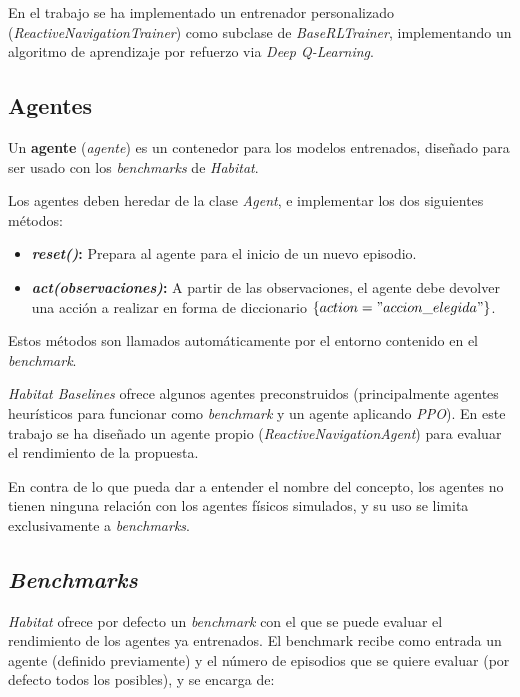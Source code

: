 En el trabajo se ha implementado un entrenador personalizado (\textit{ReactiveNavigationTrainer}) como subclase de \textit{BaseRLTrainer}, implementando un algoritmo de aprendizaje por refuerzo via \textit{Deep Q-Learning}.

\subsection{Agentes}

Un \textbf{agente} (\textit{agente}) es un contenedor para los modelos entrenados, diseñado para ser usado con los \textit{benchmarks} de \textit{Habitat}.

Los agentes deben heredar de la clase \textit{Agent}, e implementar los dos siguientes métodos:

\begin{itemize}
	\item \textbf{\textit{reset()}:} Prepara al agente para el inicio de un nuevo episodio.
	\item \textbf{\textit{act(observaciones)}:} A partir de las observaciones, el agente debe devolver una acción a realizar en forma de diccionario $\{action="accion\_elegida"\}$.
\end{itemize}

Estos métodos son llamados automáticamente por el entorno contenido en el \textit{benchmark}.

\textit{Habitat Baselines} ofrece algunos agentes preconstruidos (principalmente agentes heurísticos para funcionar como \textit{benchmark} y un agente aplicando \textit{PPO}). En este trabajo se ha diseñado un agente propio (\textit{ReactiveNavigationAgent}) para evaluar el rendimiento de la propuesta.

En contra de lo que pueda dar a entender el nombre del concepto, los agentes no tienen ninguna relación con los agentes físicos simulados, y su uso se limita exclusivamente a \textit{benchmarks}.

\subsection{\textit{Benchmarks}}

\textit{Habitat} ofrece por defecto un \textit{benchmark} con el que se puede evaluar el rendimiento de los agentes ya entrenados. El benchmark recibe como entrada un agente (definido previamente) y el número de episodios que se quiere evaluar (por defecto todos los posibles), y se encarga de:


